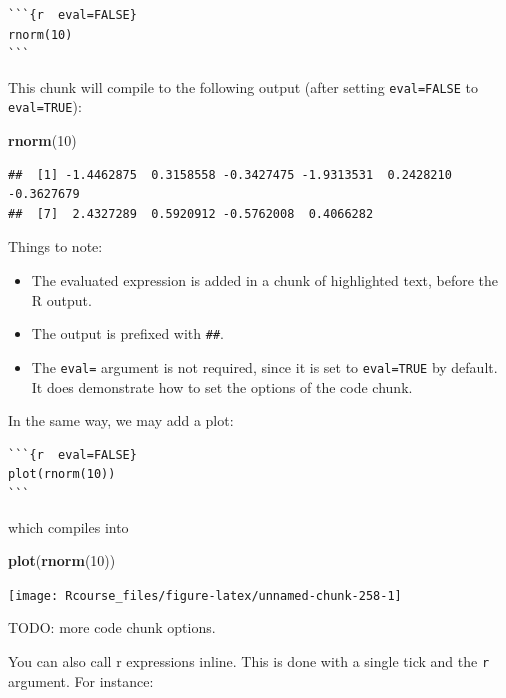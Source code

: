 \documentclass[]{book}
\newenvironment{Shaded}{\begin{snugshade}}{\end{snugshade}}
\newcommand{\KeywordTok}[1]{\textcolor[rgb]{0.13,0.29,0.53}{\textbf{#1}}}
\newcommand{\DecValTok}[1]{\textcolor[rgb]{0.00,0.00,0.81}{#1}}
\newcommand{\NormalTok}[1]{#1}
\providecommand{\tightlist}{%
  \setlength{\itemsep}{0pt}\setlength{\parskip}{0pt}}
\theoremstyle{definition}
\theoremstyle{definition}
\theoremstyle{definition}
\theoremstyle{remark}
\begin{document}
\begin{verbatim}
```{r  eval=FALSE}
rnorm(10)
```
\end{verbatim}

This chunk will compile to the following output (after setting
\texttt{eval=FALSE} to \texttt{eval=TRUE}):

\begin{Shaded}
\begin{Highlighting}[]
\KeywordTok{rnorm}\NormalTok{(}\DecValTok{10}\NormalTok{)}
\end{Highlighting}
\end{Shaded}

\begin{verbatim}
##  [1] -1.4462875  0.3158558 -0.3427475 -1.9313531  0.2428210 -0.3627679
##  [7]  2.4327289  0.5920912 -0.5762008  0.4066282
\end{verbatim}

Things to note:

\begin{itemize}
\tightlist
\item
  The evaluated expression is added in a chunk of highlighted text,
  before the R output.
\item
  The output is prefixed with \texttt{\#\#}.
\item
  The \texttt{eval=} argument is not required, since it is set to
  \texttt{eval=TRUE} by default. It does demonstrate how to set the
  options of the code chunk.
\end{itemize}

In the same way, we may add a plot:

\begin{verbatim}
```{r  eval=FALSE}
plot(rnorm(10))
```
\end{verbatim}

which compiles into

\begin{Shaded}
\begin{Highlighting}[]
\KeywordTok{plot}\NormalTok{(}\KeywordTok{rnorm}\NormalTok{(}\DecValTok{10}\NormalTok{))}
\end{Highlighting}
\end{Shaded}

\texttt{[image: Rcourse\_files/figure-latex/unnamed-chunk-258-1]}

TODO: more code chunk options.

You can also call r expressions inline. This is done with a single tick
and the \texttt{r} argument. For instance:
\end{document}
